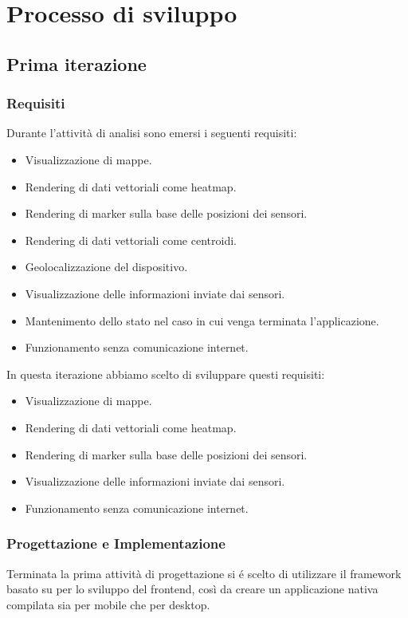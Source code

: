 \documentclass[a4paper]{article}
\begin{document}
\section*{{Processo di sviluppo}}

\subsection*{{Prima iterazione}}

\subsubsection*{{Requisiti}}

Durante l'attività di analisi sono emersi i seguenti requisiti:
\begin{itemize}
    \item Visualizzazione di mappe.
    \item Rendering di dati vettoriali come heatmap.
    \item Rendering di marker sulla base delle posizioni dei sensori.
    \item Rendering di dati vettoriali come centroidi.
    \item Geolocalizzazione del dispositivo.
    \item Visualizzazione delle informazioni inviate dai sensori.
    \item Mantenimento dello stato nel caso in cui venga terminata l'applicazione.
    \item Funzionamento senza comunicazione internet.
    \end{itemize} 
In questa iterazione abbiamo scelto di sviluppare questi requisiti:
\begin{itemize}
    \item Visualizzazione di mappe.
    \item Rendering di dati vettoriali come heatmap.
    \item Rendering di marker sulla base delle posizioni dei sensori.
    \item Visualizzazione delle informazioni inviate dai sensori.
    \item Funzionamento senza comunicazione internet.
    \end{itemize} 

\subsubsection*{{Progettazione e Implementazione}}
Terminata la prima attività di progettazione si é scelto di utilizzare il framework \cite{Flutter} basato su \cite{Dart} per lo sviluppo del frontend, così da creare un applicazione nativa compilata sia per mobile che per desktop. 
\end{document}

